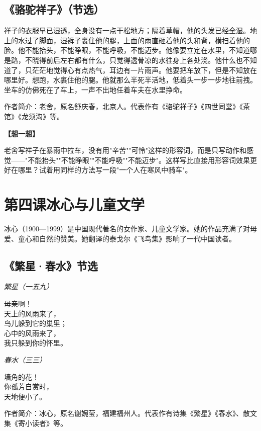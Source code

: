 \documentclass[a4paper,12pt]{ctexart}
\newcommand{\thinkq}{\vspace{0.2cm}\noindent\textcolor{orange!60!black}{\small\bfseries【想一想】}\par}
\newcommand{\authorinfo}[1]{{\vspace{0.1cm}\noindent\textcolor{blue!60!black}{\small #1}\par}}
\begin{document}
\subsection*{《骆驼祥子》（节选）}

祥子的衣服早已湿透，全身没有一点干松地方；隔着草帽，他的头发已经全湿。地上的水过了脚面，湿裤子裹住他的腿，上面的雨直砸着他的头和背，横扫着他的脸。他不能抬头，不能睁眼，不能呼吸，不能迈步。他像要立定在水里，不知道哪是路，不晓得前后左右都有什么，只觉得透骨凉的水往身上各处浇。他什么也不知道了，只茫茫地觉得心有点热气，耳边有一片雨声。他要把车放下，但是不知放在哪里好。想跑，水裹住他的腿。他就那么半死半活地，低着头一步一步地往前拽。坐车的仿佛死在了车上，一声不出地任着车夫在水里挣命。

\authorinfo{作者简介：老舍，原名舒庆春，北京人。代表作有《骆驼祥子》《四世同堂》《茶馆》《龙须沟》等。}

\thinkq 老舍写祥子在暴雨中拉车，没有用"辛苦""可怜"这样的形容词，而是只写动作和感觉——"不能抬头""不能睁眼""不能呼吸""不能迈步"。这样写比直接用形容词效果更好在哪里？试着用同样的方法写一段"一个人在寒风中骑车"。

\newpage

\section{\textcolor{orange!80!black}{第四课\quad 冰心与儿童文学}}

冰心（1900—1999）是中国现代著名的女作家、儿童文学家。她的作品充满了对母爱、童心和自然的赞美。她翻译的泰戈尔《飞鸟集》影响了一代中国读者。

\subsection*{《繁星·春水》节选}

\textit{繁星（一五九）}

母亲啊！\\
天上的风雨来了，\\
鸟儿躲到它的巢里；\\
心中的风雨来了，\\
我只躲到你的怀里。

\textit{春水（三三）}

墙角的花！\\
你孤芳自赏时，\\
天地便小了。

\authorinfo{作者简介：冰心，原名谢婉莹，福建福州人。代表作有诗集《繁星》《春水》、散文集《寄小读者》等。}
\end{document}
